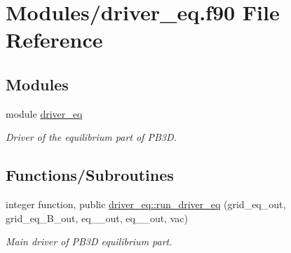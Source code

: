 \hypertarget{driver__eq_8f90}{}\section{Modules/driver\+\_\+eq.f90 File Reference}
\label{driver__eq_8f90}
\subsection*{Modules}
\begin{DoxyCompactItemize}
\item 
module \hyperlink{namespacedriver__eq}{driver\+\_\+eq}
\begin{DoxyCompactList}\small\item\em Driver of the equilibrium part of P\+B3D. \end{DoxyCompactList}\end{DoxyCompactItemize}
\subsection*{Functions/\+Subroutines}
\begin{DoxyCompactItemize}
\item 
integer function, public \hyperlink{namespacedriver__eq_adc9d5dff288fa512e5ef885627d940cc}{driver\+\_\+eq\+::run\+\_\+driver\+\_\+eq} (grid\+\_\+eq\+\_\+out, grid\+\_\+eq\+\_\+\+B\+\_\+out, eq\+\_\+\_\+out, eq\+\_\+\_\+out, vac)
\begin{DoxyCompactList}\small\item\em Main driver of P\+B3D equilibrium part. \end{DoxyCompactList}\end{DoxyCompactItemize}
